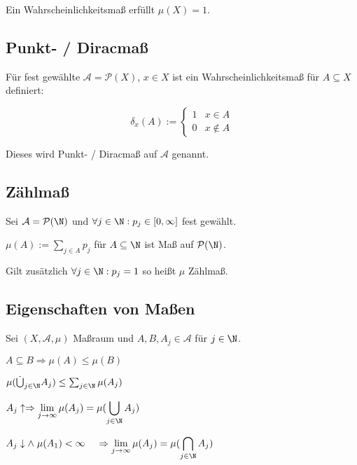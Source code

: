 Ein Wahrscheinlichkeitsmaß erfüllt $\mu(X) = 1$.

\subsection*{Punkt- / Diracmaß}

Für fest gewählte $\mathcal{A} = \mathcal{P}(X)$, $x \in X$ ist ein Wahrscheinlichkeitsmaß für $A \subseteq X$ definiert:

$$\delta_x(A) := \begin{cases}
	1 & x \in A \\
	0 & x \notin A
\end{cases}$$

Dieses wird Punkt- / Diracmaß auf $\mathcal{A}$ genannt.

\subsection*{Zählmaß}

Sei $\mathcal{A} = \mathcal{P}(\N)$ und $\forall j \in \N : p_j \in [0, \infty]$ fest gewählt.

$\mu(A) := \sum_{j\in A} p_j$ für $A \subseteq \N$ ist Maß auf $\mathcal{P}(\N)$.

Gilt zusätzlich $\forall j \in \N : p_j = 1$ so heißt $\mu$ Zählmaß.

\subsection*{Eigenschaften von Maßen}

Sei $(X, \mathcal{A}, \mu)$ Maßraum und $A, B, A_j \in \mathcal{A}$ für $j \in \N$.

\begin{description}[leftmargin=!,labelwidth=26mm]
	\item[Monotonie] $A \subseteq B \Rightarrow \mu(A) \leq \mu(B)$
	\item[$\sigma$-Subadditivität] $\mu(\dot\bigcup_{j\in \N} A_j) \leq \sum_{j\in \N} \mu(A_j)$
	\item[Stetigkeit (unten)] $A_j \uparrow \Rightarrow \displaystyle\lim_{j\to \infty} \mu(A_j) = \mu(\bigcup_{j\in \N} A_j)$
	\item[Stetigkeit (oben)] $A_j \downarrow \land \hspace*{1mm} \mu(A_1) < \infty \\ \hspace*{4mm}\Rightarrow \displaystyle\lim_{j\to \infty} \mu(A_j) = \mu(\bigcap_{j\in \N} A_j)$
\end{description}


